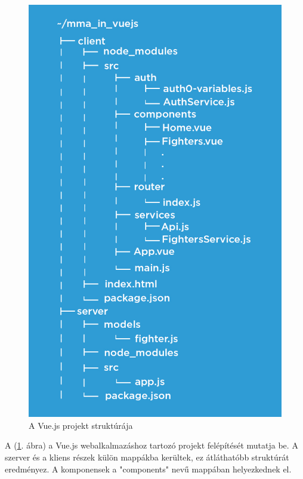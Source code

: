\begin{figure}[htb]
\centering
\includegraphics[scale=0.8]{kepek/mma_in_vue.jpeg}
\caption{A Vue.js projekt struktúrája}
\label{fig:vue_structure}
\end{figure}


A (\ref{fig:vue_structure}. ábra) a Vue.js webalkalmazáshoz tartozó projekt felépítését mutatja be. A szerver és a kliens részek külön mappákba kerültek, ez átláthatóbb struktúrát eredményez. A komponensek a "components" nevű mappában helyezkednek el. \cite{Vue könyv} \cite{Vue oldal} 